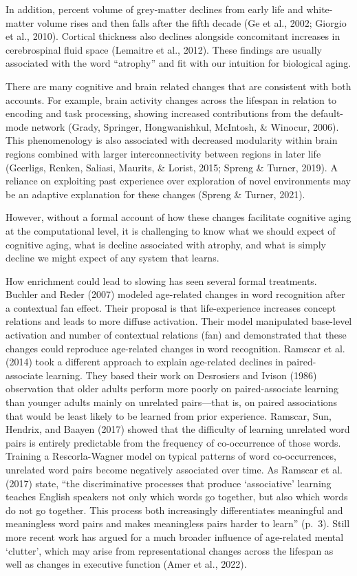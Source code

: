 \documentclass[
  man]{apa6}
\begin{document}
In addition, percent volume of grey-matter declines from early life and white-matter volume rises and then falls after the fifth decade (Ge et al., 2002; Giorgio et al., 2010). Cortical thickness also declines alongside concomitant increases in cerebrospinal fluid space (Lemaitre et al., 2012). These findings are usually associated with the word ``atrophy'' and fit with our intuition for biological aging.

There are many cognitive and brain related changes that are consistent with both accounts. For example, brain activity changes across the lifespan in relation to encoding and task processing, showing increased contributions from the default-mode network (Grady, Springer, Hongwanishkul, McIntosh, \& Winocur, 2006). This phenomenology is also associated with decreased modularity within brain regions combined with larger interconnectivity between regions in later life (Geerligs, Renken, Saliasi, Maurits, \& Lorist, 2015; Spreng \& Turner, 2019). A reliance on exploiting past experience over exploration of novel environments may be an adaptive explanation for these changes (Spreng \& Turner, 2021).

However, without a formal account of how these changes facilitate cognitive aging at the computational level, it is challenging to know what we should expect of cognitive aging, what is decline associated with atrophy, and what is simply decline we might expect of any system that learns.

How enrichment could lead to slowing has seen several formal treatments. Buchler and Reder (2007) modeled age-related changes in word recognition after a contextual fan effect. Their proposal is that life-experience increases concept relations and leads to more diffuse activation. Their model manipulated base-level activation and number of contextual relations (fan) and demonstrated that these changes could reproduce age-related changes in word recognition. Ramscar et al. (2014) took a different approach to explain age-related declines in paired-associate learning. They based their work on Desrosiers and Ivison (1986) observation that older adults perform more poorly on paired-associate learning than younger adults mainly on unrelated pairs---that is, on paired associations that would be least likely to be learned from prior experience. Ramscar, Sun, Hendrix, and Baayen (2017) showed that the difficulty of learning unrelated word pairs is entirely predictable from the frequency of co-occurrence of those words. Training a Rescorla-Wagner model on typical patterns of word co-occurrences, unrelated word pairs become negatively associated over time. As Ramscar et al. (2017) state, ``the discriminative processes that produce `associative' learning teaches English speakers not only which words go together, but also which words do not go together. This process both increasingly differentiates meaningful and meaningless word pairs and makes meaningless pairs harder to learn'' (p.~3). Still more recent work has argued for a much broader influence of age-related mental `clutter', which may arise from representational changes across the lifespan as well as changes in executive function (Amer et al., 2022).
\end{document}
